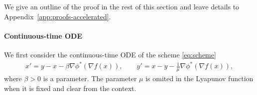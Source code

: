 \documentclass{article}
\newcommand{\dd}{\,{\rm d}}
\theoremstyle{plain}
\newtheorem{lemma}{Lemma}
\theoremstyle{remark}
\begin{document}
We give an outline of the proof in the rest of this section and leave details to Appendix~\ref{app:proofs-accelerated}.
\paragraph{Continuous-time ODE}
We first consider the continuous-time ODE of the scheme \eqref{eq:scheme}
\begin{equation}
\begin{aligned}
x' = y - x - \beta \nabla \phi^*(\nabla f(x)),\qquad 
y' = x - y - \frac{1}{\mu} \nabla\phi^*(\nabla f(x)),
\end{aligned}
\end{equation}
where $\beta>0$ is a parameter. The parameter $\mu$ is omited in the Lyapunov function when it is fixed and clear from the context.

%
%
\end{document}
